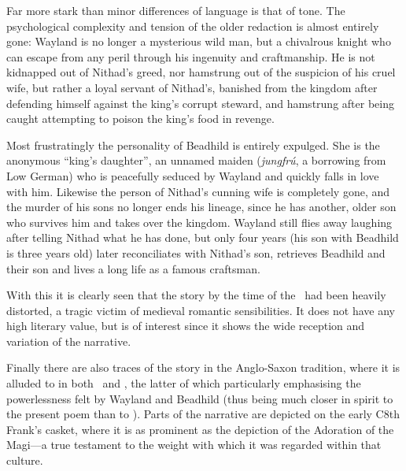 Far more stark than minor differences of language is that of tone. The psychological complexity and tension of the older redaction is almost entirely gone: Wayland is no longer a mysterious wild man, but a chivalrous knight who can escape from any peril through his ingenuity and craftmanship. He is not kidnapped out of Nithad’s greed, nor hamstrung out of the suspicion of his cruel wife, but rather a loyal servant of Nithad’s, banished from the kingdom after defending himself against the king’s corrupt steward, and hamstrung after being caught attempting to poison the king’s food in revenge.

Most frustratingly the personality of Beadhild is entirely expulged. She is the anonymous “king’s daughter”, an unnamed maiden (\emph{jungfrú}, a borrowing from Low German) who is peacefully seduced by Wayland and quickly falls in love with him. Likewise the person of Nithad’s cunning wife is completely gone, and the murder of his sons no longer ends his lineage, since he has another, older son who survives him and takes over the kingdom. Wayland still flies away laughing after telling Nithad what he has done, but only four years (his son with Beadhild is three years old) later reconciliates with Nithad’s son, retrieves Beadhild and their son and lives a long life as a famous craftsman.

With this it is clearly seen that the story by the time of the \ThidreksSaga\ had been heavily distorted, a tragic victim of medieval romantic sensibilities. It does not have any high literary value, but is of interest since it shows the wide reception and variation of the narrative.

Finally there are also traces of the story in the Anglo-Saxon tradition, where it is alluded to in both \Waldere\ and \Deor, the latter of which particularly emphasising the powerlessness felt by Wayland and Beadhild (thus being much closer in spirit to the present poem than to \ThidreksSaga). Parts of the narrative are depicted on the early C8th Frank’s casket, where it is as prominent as the depiction of the Adoration of the Magi—a true testament to the weight with which it was regarded within that culture.


